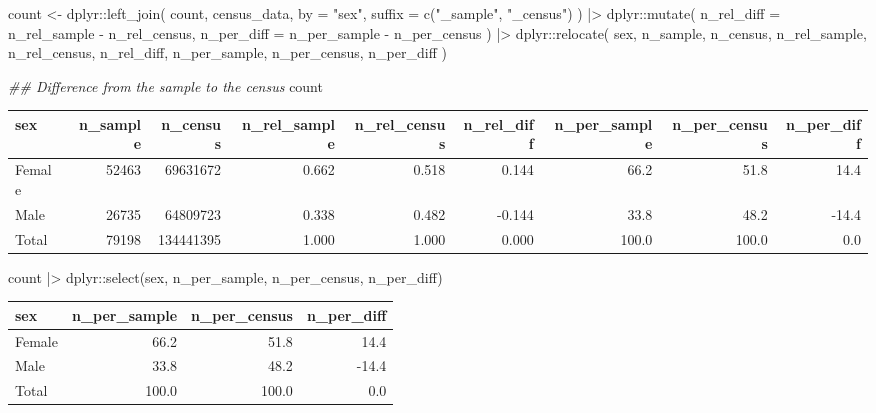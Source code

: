 \documentclass[
  12pt,
  a4paper,
  oneside]{tesesusp}
\newenvironment{Shaded}{\begin{snugshade}}{\end{snugshade}}
\newcommand{\AttributeTok}[1]{\textcolor[rgb]{0.40,0.45,0.13}{#1}}
\newcommand{\DocumentationTok}[1]{\textcolor[rgb]{0.37,0.37,0.37}{\textit{#1}}}
\newcommand{\FunctionTok}[1]{\textcolor[rgb]{0.28,0.35,0.67}{#1}}
\newcommand{\NormalTok}[1]{\textcolor[rgb]{0.00,0.23,0.31}{#1}}
\newcommand{\OtherTok}[1]{\textcolor[rgb]{0.00,0.23,0.31}{#1}}
\newcommand{\SpecialCharTok}[1]{\textcolor[rgb]{0.37,0.37,0.37}{#1}}
\newcommand{\StringTok}[1]{\textcolor[rgb]{0.13,0.47,0.30}{#1}}
\begin{document}
\begin{Shaded}
\begin{Highlighting}[numbers=left,,]
\NormalTok{count }\OtherTok{\textless{}{-}} 
\NormalTok{  dplyr}\SpecialCharTok{::}\FunctionTok{left\_join}\NormalTok{(}
\NormalTok{    count, census\_data, }
    \AttributeTok{by =} \StringTok{"sex"}\NormalTok{, }
    \AttributeTok{suffix =} \FunctionTok{c}\NormalTok{(}\StringTok{"\_sample"}\NormalTok{, }\StringTok{"\_census"}\NormalTok{)}
\NormalTok{  ) }\SpecialCharTok{|\textgreater{}}
\NormalTok{  dplyr}\SpecialCharTok{::}\FunctionTok{mutate}\NormalTok{(}
    \AttributeTok{n\_rel\_diff =}\NormalTok{ n\_rel\_sample }\SpecialCharTok{{-}}\NormalTok{ n\_rel\_census,}
    \AttributeTok{n\_per\_diff =}\NormalTok{ n\_per\_sample }\SpecialCharTok{{-}}\NormalTok{ n\_per\_census}
\NormalTok{  ) }\SpecialCharTok{|\textgreater{}}
\NormalTok{  dplyr}\SpecialCharTok{::}\FunctionTok{relocate}\NormalTok{(}
\NormalTok{    sex, n\_sample, n\_census, n\_rel\_sample, n\_rel\_census, n\_rel\_diff,}
\NormalTok{    n\_per\_sample, n\_per\_census, n\_per\_diff}
\NormalTok{  )}

\DocumentationTok{\#\# Difference from the sample to the census}
\NormalTok{count}
\end{Highlighting}
\end{Shaded}

\begin{table}
\centering
\begin{tabular}{l|r|r|r|r|r|r|r|r}
\hline
sex & n\_sample & n\_census & n\_rel\_sample & n\_rel\_census & n\_rel\_diff & n\_per\_sample & n\_per\_census & n\_per\_diff\\
\hline
Female & 52463 & 69631672 & 0.662 & 0.518 & 0.144 & 66.2 & 51.8 & 14.4\\
\hline
Male & 26735 & 64809723 & 0.338 & 0.482 & -0.144 & 33.8 & 48.2 & -14.4\\
\hline
Total & 79198 & 134441395 & 1.000 & 1.000 & 0.000 & 100.0 & 100.0 & 0.0\\
\hline
\end{tabular}
\end{table}

\begin{Shaded}
\begin{Highlighting}[numbers=left,,]
\NormalTok{count }\SpecialCharTok{|\textgreater{}}\NormalTok{ dplyr}\SpecialCharTok{::}\FunctionTok{select}\NormalTok{(sex, n\_per\_sample, n\_per\_census, n\_per\_diff)}
\end{Highlighting}
\end{Shaded}

\begin{table}
\centering
\begin{tabular}{l|r|r|r}
\hline
sex & n\_per\_sample & n\_per\_census & n\_per\_diff\\
\hline
Female & 66.2 & 51.8 & 14.4\\
\hline
Male & 33.8 & 48.2 & -14.4\\
\hline
Total & 100.0 & 100.0 & 0.0\\
\hline
\end{tabular}
\end{table}
\end{document}
